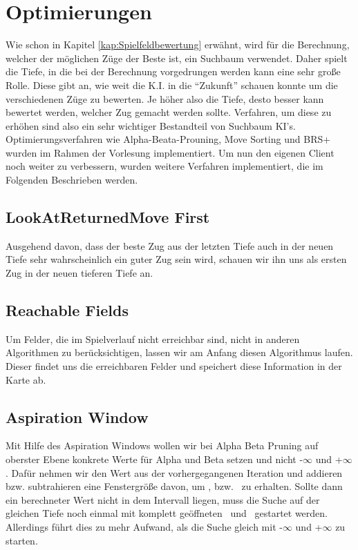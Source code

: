 \documentclass[12pt,a4paper,bibliography=totocnumbered,listof=totocnumbered]{article}
\begin{document}
\section{Optimierungen}
Wie schon in Kapitel \ref{kap:Spielfeldbewertung} erwähnt, wird für die Berechnung, welcher der möglichen Züge der Beste ist, ein Suchbaum verwendet. Daher spielt die Tiefe, in die bei der Berechnung vorgedrungen werden kann eine sehr große Rolle. Diese gibt an, wie weit die K.I. in die ``Zukunft'' schauen konnte um die verschiedenen Züge zu bewerten. Je höher also die Tiefe, desto besser kann bewertet werden, welcher Zug gemacht werden sollte. Verfahren, um diese zu erhöhen sind also ein sehr wichtiger Bestandteil von Suchbaum KI's. Optimierungsverfahren wie Alpha-Beata-Prouning, Move Sorting und BRS+ wurden im Rahmen der Vorlesung implementiert. Um nun den eigenen Client noch weiter zu verbessern, wurden weitere Verfahren implementiert, die im Folgenden Beschrieben werden.

\subsection{LookAtReturnedMove First}
Ausgehend davon, dass der beste Zug aus der letzten Tiefe auch in der neuen Tiefe sehr wahrscheinlich ein guter Zug sein wird, schauen wir ihn uns als ersten Zug in der neuen tieferen Tiefe an.

\subsection{Reachable Fields}
Um Felder, die im Spielverlauf nicht erreichbar sind, nicht in anderen Algorithmen zu berücksichtigen, lassen wir am Anfang diesen Algorithmus laufen. Dieser findet uns die erreichbaren Felder und speichert diese Information in der Karte ab.

\subsection{Aspiration Window}
Mit Hilfe des Aspiration Windows wollen wir bei Alpha Beta Pruning auf oberster Ebene konkrete Werte für Alpha und Beta setzen und nicht  -$\infty$ und +$\infty$ . Dafür nehmen wir den Wert aus der vorhergegangenen Iteration und addieren bzw. subtrahieren eine Fenstergröße davon, um \textalpha, bzw. \textbeta\ zu erhalten. Sollte dann ein berechneter Wert nicht in dem Intervall liegen, muss die Suche auf der gleichen Tiefe noch einmal mit komplett geöffneten \textalpha\ und \textbeta\ gestartet werden. Allerdings führt dies zu mehr Aufwand, als die Suche gleich mit -$\infty$ und +$\infty$ zu starten.
\end{document}
